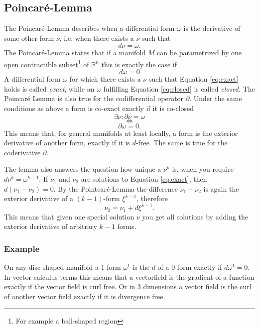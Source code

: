 \subsection{Poincar\'e-Lemma}
The Poincar\'e-Lemma describes when a differential form $\omega$ is the derivative of some other form $\nu$, i.e. when there exists a $\nu$ such that
\begin{equation} d\nu = \omega .\label{eq:exact}\end{equation}
The Poincar\'e-Lemma states that if a manifold $M$ can be parametrized by one open contractible subset\footnote{For example a ball-shaped region} of $\mathbb R^n$ this is exactly the case if
\begin{equation} d\omega = 0 \label{eq:closed}\end{equation}
A differential form $\omega$ for which there exists a $\nu$ such that Equation \ref{eq:exact} holds is called \emph{exact}, while an $\omega$ fulfilling Equation \ref{eq:closed} is called \emph{closed}. The Poincar\'e Lemma is also true for the codifferential operator $\partial$. Under the same conditions as above a form is co-exact exactly if it is co-closed
\[\exists \nu : \partial \nu = \omega\] \[\Leftrightarrow\]\[ \partial \omega = 0.\]
This means that, for general manifolds at least locally, a form is the exterior derivative of another form, exactly if it is $d$-free. The same is true for the coderivative $\partial$. 


The lemma also answers the question how unique a $\nu^{k}$ is, when you require $d\nu^{k} = \omega^{k+1}$. If $\nu_1$ and $\nu_2$ are solutions to Equation \ref{eq:exact}, then $d(\nu_1-\nu_2) = 0$. By the Pointcar\'e-Lemma the difference $ \nu_1 - \nu_2$ is again the exterior derivative of a $(k-1)$-form $\xi^{k-1}$, therefore 
\[\nu_2 = \nu_1 +  d\xi^{k-1}.\]
This means that given one special solution $\nu$ you get all solutions by adding the exterior derivative of arbitrary $k-1$ forms.

\subsubsection{Example}
On any disc shaped manifold a $1$-form $\omega^1$ is the $d$ of a $0$-form exactly if $d\omega^1 = 0$. In vector calculus terms this means that a vectorfield is the gradient of a function exactly if the vector field is curl free. Or in 3 dimensions a vector field is the curl of another vector field exactly if it is divergence free.


